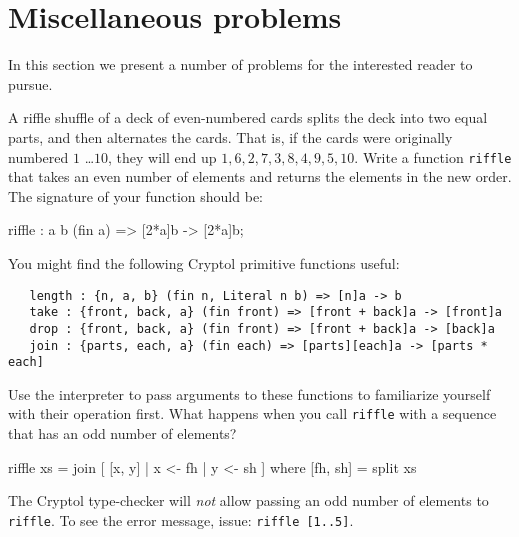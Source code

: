 
\chapter{Miscellaneous problems}


In this section we present a number of problems for the interested
reader to pursue.

\begin{Exercise}\label{ex:misc:riffle}
  A riffle shuffle of a deck of even-numbered cards splits the deck
  into two equal parts, and then alternates the cards. That is, if the
  cards were originally numbered $1$ \ldots $10$, they will end up $1,
  6, 2, 7, 3, 8, 4, 9, 5, 10$. Write a function {\tt riffle} that
  takes an even number of elements and returns the elements in the new
  order. The signature of your function should be:
\begin{code}
   riffle : {a b} (fin a) => [2*a]b -> [2*a]b;
\end{code}
You might find the following Cryptol primitive functions useful:
\begin{Verbatim}
   length : {n, a, b} (fin n, Literal n b) => [n]a -> b
   take : {front, back, a} (fin front) => [front + back]a -> [front]a
   drop : {front, back, a} (fin front) => [front + back]a -> [back]a
   join : {parts, each, a} (fin each) => [parts][each]a -> [parts * each]
\end{Verbatim}
Use the interpreter to pass arguments to these functions to
familiarize yourself with their operation first. What happens when you
call {\tt riffle} with a sequence that has an odd number of elements?
\end{Exercise}

\begin{Answer}
\begin{code}
  riffle xs = join [ [x, y] | x <- fh | y <- sh ]
    where [fh, sh] = split xs
\end{code}
The Cryptol type-checker will {\em not} allow passing an odd number of
elements to {\tt riffle}. To see the error message, issue: {\tt riffle
  [1..5]}.
\end{Answer}

